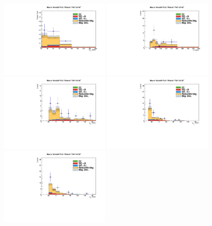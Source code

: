 \begin{figure}
\begin{center}
  \includegraphics[width=0.49\textwidth]{4_Analisys/pics/7TeV/plots/mmt/f3/Full_charge3/final-f3-subMass-Full.pdf}
  \includegraphics[width=0.49\textwidth]{4_Analisys/pics/7TeV/plots/mmt/f3/final-LT-charge3.pdf}\\
  \includegraphics[width=0.49\textwidth]{4_Analisys/pics/7TeV/plots/mmt/f3/Full_charge3/final-f3-m1Pt-Full.pdf}
  \includegraphics[width=0.49\textwidth]{4_Analisys/pics/7TeV/plots/mmt/f3/Full_charge3/final-f3-m2Pt-Full.pdf}\\
  \includegraphics[width=0.49\textwidth]{4_Analisys/pics/7TeV/plots/mmt/f3/Full_charge3/final-f3-tPt-Full.pdf}

\end{center}
\end{figure}
